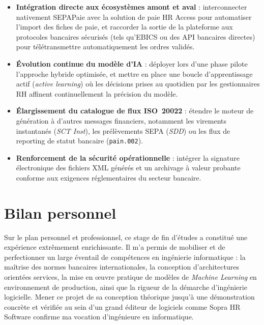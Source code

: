 \begin{itemize}
    \item \textbf{Intégration directe aux écosystèmes amont et aval} : interconnecter nativement SEPAPaie avec la solution de paie HR Access pour automatiser l'import des fiches de paie, et raccorder la sortie de la plateforme aux protocoles bancaires sécurisés (tels qu'EBICS ou des API bancaires directes) pour télétransmettre automatiquement les ordres validés.
    \item \textbf{Évolution continue du modèle d'IA} : déployer lors d'une phase pilote l'approche hybride optimisée, et mettre en place une boucle d'apprentissage actif (\textit{active learning}) où les décisions prises au quotidien par les gestionnaires RH affinent continuellement la précision du modèle.
    \item \textbf{Élargissement du catalogue de flux ISO~20022} : étendre le moteur de génération à d'autres messages financiers, notamment les virements instantanés (\textit{SCT Inst}), les prélèvements SEPA (\textit{SDD}) ou les flux de reporting de statut bancaire (\texttt{pain.002}).
    \item \textbf{Renforcement de la sécurité opérationnelle} : intégrer la signature électronique des fichiers XML générés et un archivage à valeur probante conforme aux exigences réglementaires du secteur bancaire.
\end{itemize}

\section*{Bilan personnel}

Sur le plan personnel et professionnel, ce stage de fin d'études a constitué une expérience extrêmement enrichissante. Il m'a permis de mobiliser et de perfectionner un large éventail de compétences en ingénierie informatique : la maîtrise des normes bancaires internationales, la conception d'architectures orientées services, la mise en \oe uvre pratique de modèles de \textit{Machine Learning} en environnement de production, ainsi que la rigueur de la démarche d'ingénierie logicielle. Mener ce projet de sa conception théorique jusqu'à une démonstration concrète et vérifiée au sein d'un grand éditeur de logiciels comme Sopra HR Software confirme ma vocation d'ingénieure en informatique.
